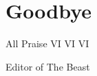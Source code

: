 \documentclass{beamer}
\begin{document}
\section{Goodbye}
\begin{frame}
		\centerline{\huge All Praise VI VI VI}
		\vspace{0.5cm}
		\centerline{\huge Editor of The Beast}
		\begin{figure}
				\centering
				\qquad
		\end{figure}
\end{frame}
\end{document}
